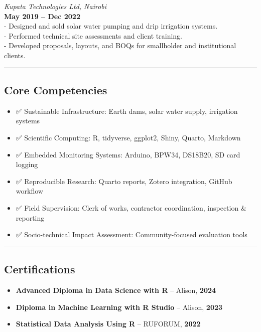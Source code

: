 \documentclass[
  11pt,
]{article}
\providecommand{\tightlist}{%
  \setlength{\itemsep}{0pt}\setlength{\parskip}{0pt}}
\begin{document}
\emph{Kupata Technologies Ltd, Nairobi}\\
\textbf{May 2019 -- Dec 2022}\\
- Designed and sold solar water pumping and drip irrigation systems.\\
- Performed technical site assessments and client training.\\
- Developed proposals, layouts, and BOQs for smallholder and
institutional clients.

\begin{center}\rule{0.5\linewidth}{0.5pt}\end{center}

\subsection{Core Competencies}\label{core-competencies}

\begin{itemize}
\tightlist
\item
  ✅ Sustainable Infrastructure: Earth dams, solar water supply,
  irrigation systems\\
\item
  ✅ Scientific Computing: R, tidyverse, ggplot2, Shiny, Quarto,
  Markdown\\
\item
  ✅ Embedded Monitoring Systems: Arduino, BPW34, DS18B20, SD card
  logging\\
\item
  ✅ Reproducible Research: Quarto reports, Zotero integration, GitHub
  workflow\\
\item
  ✅ Field Supervision: Clerk of works, contractor coordination,
  inspection \& reporting\\
\item
  ✅ Socio-technical Impact Assessment: Community-focused evaluation
  tools
\end{itemize}

\begin{center}\rule{0.5\linewidth}{0.5pt}\end{center}

\subsection{Certifications}\label{certifications}

\begin{itemize}
\tightlist
\item
  \textbf{Advanced Diploma in Data Science with R} -- Alison,
  \textbf{2024}\\
\item
  \textbf{Diploma in Machine Learning with R Studio} -- Alison,
  \textbf{2023}\\
\item
  \textbf{Statistical Data Analysis Using R} -- RUFORUM, \textbf{2022}
\end{itemize}
\end{document}
